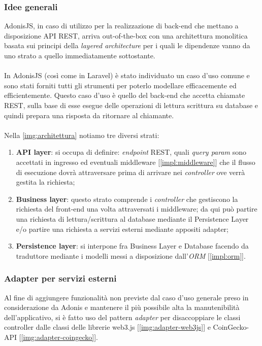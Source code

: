         \subsubsection{Idee generali}
        AdonisJS, in caso di utilizzo per la realizzazione di back-end che mettano a disposizione API REST, arriva out-of-the-box con una architettura monolitica basata sui principi della \textit{layered architecture} per i quali le dipendenze vanno da uno strato a quello immediatamente sottostante.
        \\\\
        In AdonisJS (così come in Laravel) è stato individuato un caso d'uso comune e sono stati forniti tutti gli strumenti per poterlo modellare efficacemente ed efficientemente. Questo caso d'uso è quello del back-end che accetta chiamate REST, sulla base di esse esegue delle operazioni di lettura scrittura su database e quindi prepara una risposta da ritornare al chiamante.
        \\\\
        Nella \autoref{img:architettura} notiamo tre diversi strati:
        \begin{enumerate}
            \item \textbf{API layer}: si occupa di definire: \textit{endpoint} REST, quali \textit{query param} sono accettati in ingresso ed eventuali middleware [\autoref{impl:middleware}] che il flusso di esecuzione dovrà attraversare prima di arrivare nei \textit{controller} ove verrà gestita la richiesta;
            \item \textbf{Business layer}: questo strato comprende i \textit{controller} che gestiscono la richiesta del front-end una volta attraversati i middleware; da qui può partire una richiesta di lettura/scrittura al database mediante il Persistence Layer e/o partire una richiesta a servizi esterni mediante appositi adapter;
            \item \textbf{Persistence layer}: si interpone fra Business Layer e Database facendo da traduttore mediante i modelli messi a disposizione dall'\textit{ORM} [\autoref{impl:orm}].
        \end{enumerate}

        \subsubsection{Adapter per servizi esterni}
        \label{proj:adapter}
        Al fine di aggiungere funzionalità non previste dal caso d'uso generale preso in considerazione da Adonis e mantenere il più possibile alta la manutenibilità dell'applicativo, si è fatto uso del pattern \textit{adapter} per disaccoppiare le classi controller dalle classi delle librerie web3.js [\autoref{img:adapter-web3js}] e CoinGecko-API [\autoref{img:adapter-coingecko}].

